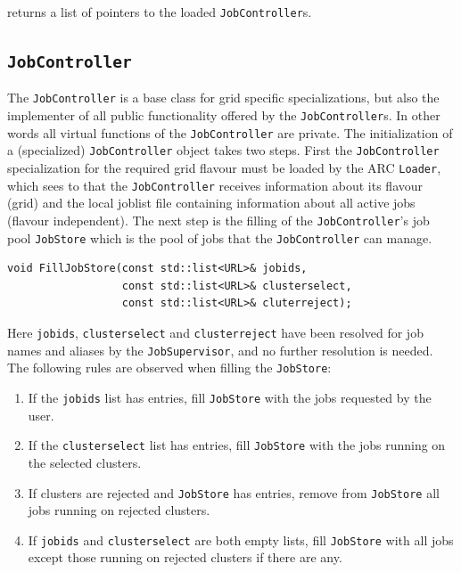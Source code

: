 \documentclass{book}
\newcommand{\JobController}{\texttt{JobController}}
\newcommand{\JobSupervisor}{\texttt{JobSupervisor}}
\newcommand{\Loader}{\texttt{Loader}}
\begin{document}
returns a list of pointers to the loaded {\JobController}s.

\subsection{{\JobController}}

The {\JobController} is a base class for grid specific
specializations, but also the implementer of all public functionality
offered by the {\JobController}s. In other words all virtual functions
of the {\JobController} are private. The initialization of a
(specialized) {\JobController} object takes two steps. First the
{\JobController} specialization for the required grid flavour must be
loaded by the ARC {\Loader}, which sees to that the {\JobController}
receives information about its flavour (grid) and the local joblist
file containing information about all active jobs (flavour
independent). The next step is the filling of the {\JobController}'s job
pool \texttt{JobStore} which is the pool of jobs that the
{\JobController} can manage.

\begin{shaded}
\begin{verbatim}
void FillJobStore(const std::list<URL>& jobids,
                  const std::list<URL>& clusterselect,
                  const std::list<URL>& cluterreject);
\end{verbatim}
\end{shaded}

Here \texttt{jobids}, \texttt{clusterselect} and
\texttt{clusterreject} have been resolved for job names and aliases by
the {\JobSupervisor}, and no further resolution is needed. The
following rules are observed when filling the \texttt{JobStore}:

\begin{enumerate}
\item{If the \texttt{jobids} list has entries, fill \texttt{JobStore}
  with the jobs requested by the user.}
\item{If the \texttt{clusterselect} list has entries, fill
  \texttt{JobStore} with the jobs running on the selected clusters.}
\item{If clusters are rejected and \texttt{JobStore} has entries,
  remove from \texttt{JobStore} all jobs running on rejected
  clusters.}
\item{If \texttt{jobids} and \texttt{clusterselect} are both empty
  lists, fill \texttt{JobStore} with all jobs except those running on
  rejected clusters if there are any.}
\end{enumerate}
\end{document}
